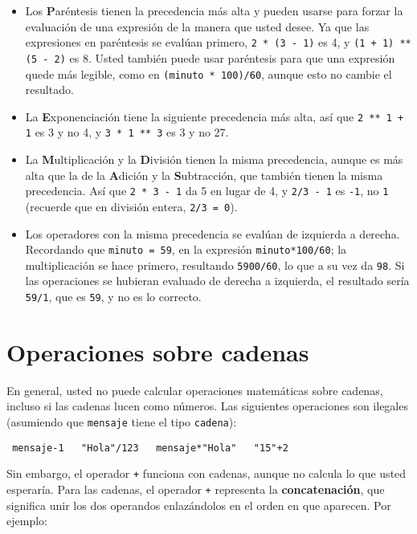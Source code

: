 \begin{itemize}
	\item Los {\bf P}aréntesis tienen la precedencia más alta y pueden
	usarse para forzar la evaluación de una expresión de la manera que usted
	desee. Ya que las expresiones en paréntesis se evalúan primero, 
	\texttt{2 * (3 - 1)} es 4, y \texttt{(1 + 1) ** (5 - 2)} es 8. 
	Usted también puede usar paréntesis para
	que una expresión quede más legible, como en \texttt{(minuto * 100)/60},
	aunque esto no cambie el resultado.
	\item La {\bf E}xponenciación tiene la siguiente precedencia más alta, así 
	que
	\texttt{2 ** 1 + 1} es 3 y no 4, y \texttt{3 * 1 ** 3} es 3 y no 27.
	\item La {\bf M}ultiplicación y la {\bf D}ivisión tienen la misma 
	precedencia,
	aunque es más alta que la de la {\bf A}dición y la {\bf S}ubtracción, que
	también tienen la misma precedencia. Así que \texttt{2 * 3 - 1} da 5 en 
	lugar
	de 4, y \texttt{2/3 - 1} es \texttt{-1}, no \texttt{1} (recuerde que en
	división entera, \texttt{2/3 = 0}).
	\item Los operadores con la misma precedencia se evalúan de izquierda
	a derecha.  Recordando que \texttt{minuto = 59}, en la expresión
	\texttt{minuto*100/60}; la multiplicación
	se hace primero, resultando \texttt{5900/60}, lo que a su vez da 
	\texttt{98}.
	Si las operaciones se hubieran evaluado de derecha a izquierda, el resultado
	sería \texttt{59/1}, que es \texttt{59}, y no es lo correcto.
\end{itemize}


\section{Operaciones sobre cadenas}

En general, usted no puede calcular operaciones matemáticas sobre cadenas,
incluso si las cadenas lucen como números. Las siguientes operaciones son 
ilegales (asumiendo que \texttt{mensaje} tiene el tipo \texttt{cadena}):

\beforeverb
\begin{verbatim}
 mensaje-1   "Hola"/123   mensaje*"Hola"   "15"+2
\end{verbatim}
\afterverb
%

Sin embargo, el operador \texttt{+} funciona con cadenas, aunque no calcula lo
que usted esperaría.  Para las cadenas, el operador \texttt{+}
representa la {\bf concatenación}, que significa unir los dos operandos 
enlazándolos en el orden en que aparecen. Por ejemplo:

